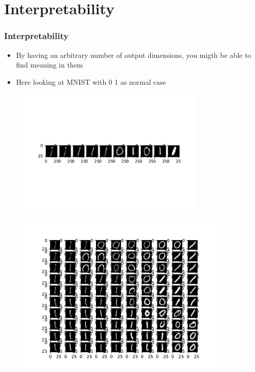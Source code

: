 \documentclass[hyperref={pdfpagelabels=false}]{beamer}
\begin{document}
\section{Interpretability}\label{sec:Interpretability}



\begin{frame}[label=Interpretability]
\frametitle{Interpretability}
\vspace{1cm}
\begin{itemize}

    \item By having an arbitrary number of output dimensions, you migth be able to find meaning in them

    \item Here looking at MNIST with 0 1 as normal case


\end{itemize}

\begin{figure}[H] 
  \centering
\includegraphics[width=0.8\textwidth]{../imgs/oneline}
\label{fig:oneline}
  \end{figure}


\end{frame}



\begin{frame}[label=]
\frametitle{}
\begin{figure}[H] 
  \centering
\includegraphics[width=0.9\textwidth]{../imgs/map}
\label{fig:map}
  \end{figure}


\end{frame}
\end{document}
